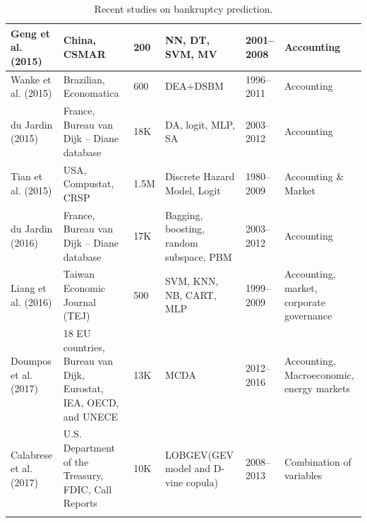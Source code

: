 \begin{center}
\begin{longtable}{|p{2.5cm}|p{2.5cm}|p{1.2cm}|p{3.5cm}|p{2cm}|p{2cm}|}
    Geng et al. (2015)\cite{geng2015prediction}& China, CSMAR & 200 & NN, DT, SVM, MV & 2001–2008 & Accounting \\ \hline
    
    Wanke et al. (2015)\cite{wanke2015financial} & Brazilian, Economatica & 600 & DEA+DSBM & 1996–2011 & Accounting \\ \hline
    
    du Jardin (2015)\cite{du2015bankruptcy} & France, Bureau van Dijk – Diane database & 18K & DA, logit, MLP, SA & 2003–2012 & Accounting \\ \hline
    
    Tian et al. (2015)\cite{tian2015variable} & USA, Compustat, CRSP & 1.5M & Discrete Hazard Model, Logit & 1980–2009 & Accounting \& Market \\ \hline
    
    du Jardin (2016)\cite{du2016two} & France, Bureau van Dijk – Diane database & 17K & Bagging, boosting, random subspace, PBM & 2003–2012 & Accounting \\ \hline
    
    Liang et al. (2016)\cite{liang2016financial} & Taiwan Economic Journal (TEJ) & 500 & SVM, KNN, NB, CART, MLP & 1999–2009 & Accounting, market, corporate governance \\ \hline
    
    Doumpos et al. (2017)\cite{doumpos2017corporate} & 18 EU countries, Bureau van Dijk, Eurostat, IEA, OECD, and UNECE & 13K & MCDA & 2012–2016 & Accounting, Macroeconomic, energy markets \\ \hline
    
    Calabrese et al. (2017)\cite{calabrese2017effectiveness} & U.S. Department of the Treasury, FDIC, Call Reports & 10K & LOBGEV(GEV model and D-vine copula) & 2008–2013 & Combination of variables \\ 
\hline
    

\caption{Recent studies on bankruptcy prediction.} 
\label{tab:Recent_studies_on_bankruptcy_prediction} 
\end{longtable}
\end{center}

